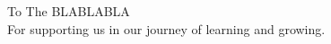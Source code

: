 \begin{dedication}
{\large{To The BLABLABLA}}\\[5mm]
For supporting us in our journey of learning and growing.
\end{dedication}

